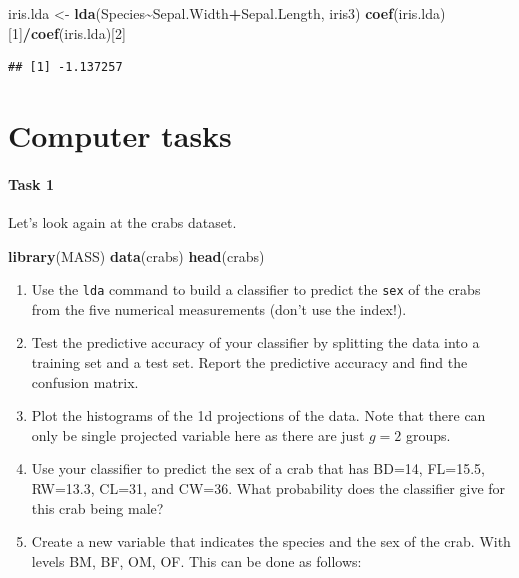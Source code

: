\documentclass[
]{book}
\newenvironment{Shaded}{\begin{snugshade}}{\end{snugshade}}
\newcommand{\DecValTok}[1]{\textcolor[rgb]{0.00,0.00,0.81}{#1}}
\newcommand{\FunctionTok}[1]{\textcolor[rgb]{0.13,0.29,0.53}{\textbf{#1}}}
\newcommand{\NormalTok}[1]{#1}
\newcommand{\OtherTok}[1]{\textcolor[rgb]{0.56,0.35,0.01}{#1}}
\newcommand{\SpecialCharTok}[1]{\textcolor[rgb]{0.81,0.36,0.00}{\textbf{#1}}}
\theoremstyle{definition}
\theoremstyle{definition}
\theoremstyle{definition}
\theoremstyle{definition}
\theoremstyle{remark}
\begin{document}
\begin{Shaded}
\begin{Highlighting}[]
\NormalTok{iris.lda }\OtherTok{\textless{}{-}} \FunctionTok{lda}\NormalTok{(Species}\SpecialCharTok{\textasciitilde{}}\NormalTok{Sepal.Width}\SpecialCharTok{+}\NormalTok{Sepal.Length, iris3)}
\FunctionTok{coef}\NormalTok{(iris.lda)[}\DecValTok{1}\NormalTok{]}\SpecialCharTok{/}\FunctionTok{coef}\NormalTok{(iris.lda)[}\DecValTok{2}\NormalTok{]}
\end{Highlighting}
\end{Shaded}

\begin{verbatim}
## [1] -1.137257
\end{verbatim}

\section{Computer tasks}\label{computer-tasks-4}

\paragraph*{Task 1}\label{task-1-3}

Let's look again at the crabs dataset.

\begin{Shaded}
\begin{Highlighting}[]
\FunctionTok{library}\NormalTok{(MASS)}
\FunctionTok{data}\NormalTok{(crabs)}
\FunctionTok{head}\NormalTok{(crabs)}
\end{Highlighting}
\end{Shaded}

\begin{enumerate}
\def\labelenumi{\roman{enumi}.}
\item
  Use the \texttt{lda} command to build a classifier to predict the \texttt{sex} of the crabs from the
  five numerical measurements (don't use the index!).
\item
  Test the predictive accuracy of your classifier by splitting the data into a training set and a test set. Report the predictive accuracy and find the confusion matrix.
\item
  Plot the histograms of the 1d projections of the data. Note that there can only be single projected variable here as there are just \(g=2\) groups.
\item
  Use your classifier to predict the sex of a crab that has BD=14, FL=15.5, RW=13.3, CL=31, and CW=36. What probability does the classifier give for this crab being male?
\item
  Create a new variable that indicates the species and the sex of the crab. With levels
  BM, BF, OM, OF. This can be done as follows:
\end{enumerate}
\end{document}
